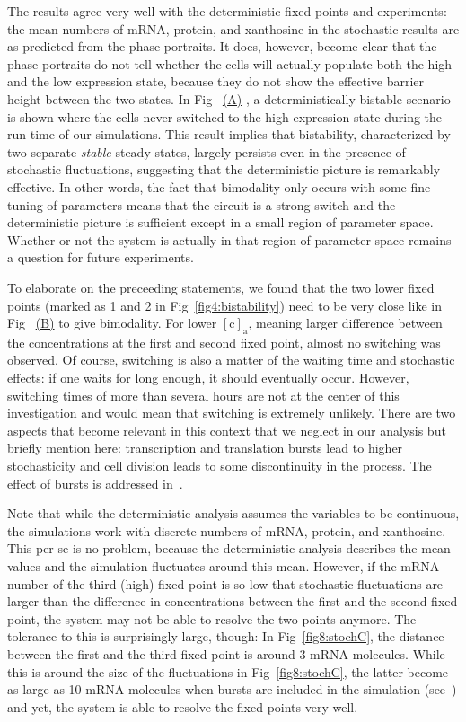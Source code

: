 \documentclass[10pt,letterpaper]{article}
\newcommand{\n}[1]{\mathrm{#1}}
\newcommand\subref[2]{%
	\def\myref{\getrefnumber{#1}}%
	\hyperref[#1]{\myref\mbox{#2}}%
}
\begin{document}
	The results agree very well with the deterministic fixed points and
	experiments: the mean numbers of mRNA, protein, and xanthosine in the
	stochastic results are as predicted from the phase portraits. It does,
	however, become clear that the phase portraits do not tell whether the cells
	will actually populate both the high and the low expression state,
	because they do not show the effective barrier height between the two states.
	In Fig~\subref{fig8:stochC}{(A)}, a deterministically bistable scenario is shown where the cells never switched to the high
	expression state during the run time of our simulations. This result
	implies that bistability, characterized by two separate
	\emph{stable} steady-states, largely persists even in the presence
	of stochastic fluctuations, suggesting that the deterministic
	picture is remarkably effective. In other words,
	the fact that bimodality only occurs with some fine tuning of
	parameters means that the circuit is a strong switch and the
	deterministic picture is sufficient except in a small region of
	parameter space. Whether or not the system is actually in that
	region of parameter space remains a question for future experiments.

	To elaborate on the preceeding statements,
	we found that the two lower fixed points (marked as 1 and 2 in
	Fig~\ref{fig4:bistability}) need to be very close like in
	Fig~\subref{fig8:stochC}{(B)} to give bimodality. For lower $\n{[c]_a}$,
	meaning larger difference between the concentrations at the first and second fixed point,
	almost no switching was observed. Of course, switching is also a matter of the
	waiting time and stochastic effects: if one waits for long enough, it
	should eventually occur. However, switching times of more than several hours
	are not at the center of this investigation and would mean that switching is
	extremely unlikely. There are two aspects that become relevant in this
	context that we neglect in our analysis but briefly mention here:
	transcription and translation bursts lead to higher stochasticity and cell
	division leads to some discontinuity in the process. The effect of bursts is addressed in~.
	
	Note that while the deterministic analysis assumes the variables to be
	continuous, the simulations work with discrete numbers of mRNA, protein, and
	xanthosine. This per se is no problem, because the deterministic analysis
	describes the mean values and the simulation fluctuates around this mean.
	However, if the mRNA number of the third (high) fixed point is so low that stochastic fluctuations are larger than the difference in concentrations between the first and the second fixed point, the
	system may not be able to resolve the two points anymore. The tolerance to this is surprisingly large, though: In Fig~\ref{fig8:stochC}, the distance between the first and the third fixed point is around 3 mRNA molecules. While this is around the size of the fluctuations in Fig~\ref{fig8:stochC}, the latter become as large as 10 mRNA molecules when bursts are included in the simulation (see~) and yet, the system is able to resolve the fixed points very well.
	
\end{document}
